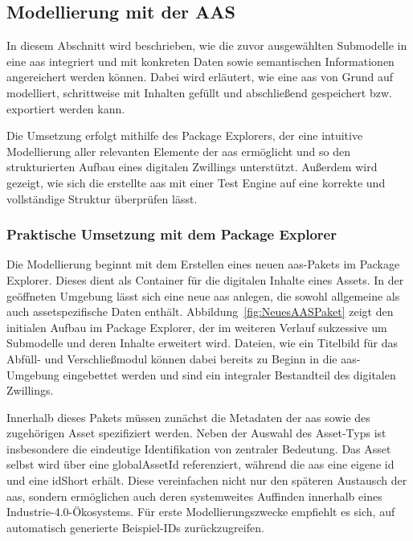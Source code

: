 \subsection{Modellierung mit der AAS}
In diesem Abschnitt wird beschrieben, wie die zuvor ausgewählten Submodelle in eine \acs{aas} integriert und mit konkreten Daten sowie semantischen Informationen angereichert werden können.
Dabei wird erläutert, wie eine \acs{aas} von Grund auf modelliert, schrittweise mit Inhalten gefüllt und abschließend gespeichert bzw. exportiert werden kann.  

Die Umsetzung erfolgt mithilfe des Package Explorers, der eine intuitive Modellierung aller relevanten Elemente der \acs{aas} ermöglicht und so den strukturierten Aufbau eines digitalen Zwillings unterstützt.
Außerdem wird gezeigt, wie sich die erstellte \acs{aas} mit einer Test Engine auf eine korrekte und vollständige Struktur überprüfen lässt.

\subsubsection{Praktische Umsetzung mit dem Package Explorer}

Die Modellierung beginnt mit dem Erstellen eines neuen \acs{aas}-Pakets im Package Explorer.
Dieses dient als Container für die digitalen Inhalte eines Assets.  
In der geöffneten Umgebung lässt sich eine neue \acs{aas} anlegen, die sowohl allgemeine als auch assetspezifische Daten enthält. 
Abbildung~\ref{fig:NeuesAASPaket} zeigt den initialen Aufbau im Package Explorer, der im weiteren Verlauf sukzessive um Submodelle und deren Inhalte erweitert wird.
Dateien, wie ein Titelbild für das Abfüll- und Verschließmodul können dabei bereits zu Beginn in die \acs{aas}-Umgebung eingebettet werden und sind ein integraler Bestandteil des digitalen Zwillings.

Innerhalb dieses Pakets müssen zunächst die Metadaten der \acs{aas} sowie des zugehörigen Asset spezifiziert werden.
Neben der Auswahl des Asset-Typs ist insbesondere die eindeutige Identifikation von zentraler Bedeutung.
Das Asset selbst wird über eine globalAssetId referenziert, während die \acs{aas} eine eigene \acs{id} und eine idShort erhält.
Diese vereinfachen nicht nur den späteren Austausch der \acs{aas}, sondern ermöglichen auch deren systemweites Auffinden innerhalb eines Industrie-4.0-Ökosystems.
Für erste Modellierungszwecke empfiehlt es sich, auf automatisch generierte Beispiel-IDs zurückzugreifen.


